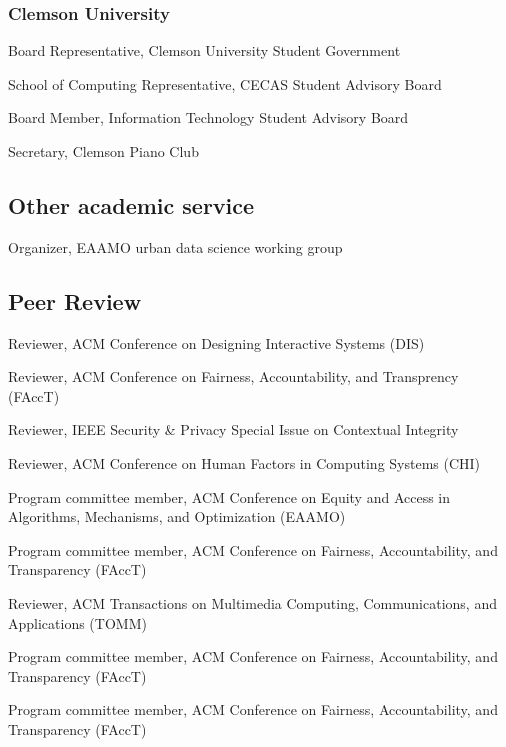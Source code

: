 \documentclass[10pt,letterpaper]{report}
\begin{document}
    \subsubsection{Clemson University}
    \begin{tablist} 
        \item[2021] Board Representative, Clemson University Student Government 
        \item[2021] School of Computing Representative, CECAS Student Advisory Board 
        \item[2020] Board Member, Information Technology Student Advisory Board
        \item[2019] Secretary, Clemson Piano Club 
    \end{tablist} 

    \subsection*{Other academic service}
    \begin{tablist}
        \item[2024-] Organizer, EAAMO urban data science working group
    \end{tablist}

    \subsection*{Peer Review} 

    \begin{tablist} 
        \item[2026] Reviewer, ACM Conference on Designing Interactive Systems (DIS)
        \item[2026] Reviewer, ACM Conference on Fairness, Accountability, and Transprency (FAccT)
        \item[2025] Reviewer, IEEE Security \& Privacy Special Issue on Contextual Integrity
        \item[2025] Reviewer, ACM Conference on Human Factors in Computing Systems (CHI)
        \item[2025] Program committee member, ACM Conference on Equity and Access in Algorithms, Mechanisms, and Optimization (EAAMO)
        \item[2025] Program committee member, ACM Conference on Fairness, Accountability, and Transparency (FAccT)
        \item[2024] Reviewer, ACM Transactions on Multimedia Computing, Communications, and Applications (TOMM)
        \item[2024] Program committee member, ACM Conference on Fairness, Accountability, and Transparency (FAccT)
        \item[2023] Program committee member, ACM Conference on Fairness, Accountability, and Transparency (FAccT) 
    
    \end{tablist}
\end{document}
